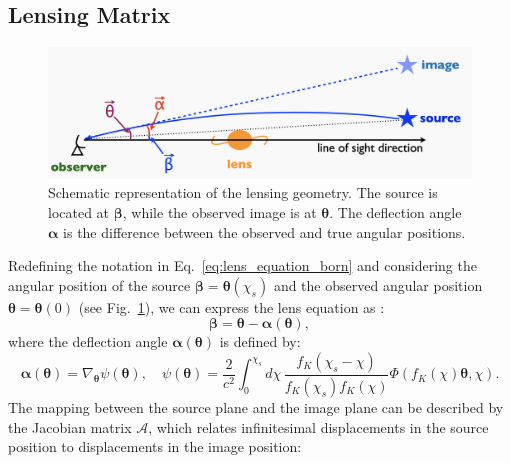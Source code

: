 \subsection{Lensing Matrix}
\begin{figure}[ht]
    \centering
    \includegraphics[width=\textwidth]{figures/Lens_overview_Oguri.png}
    \caption{Schematic representation of the lensing geometry. The source is located at $\boldsymbol{\beta}$, while the observed image is at $\boldsymbol{\theta}$. The deflection angle $\boldsymbol{\alpha}$ is the difference between the observed and true angular positions.}
    \label{fig:lens_geometry}
\end{figure}
Redefining the notation in Eq.~\eqref{eq:lens_equation_born} and considering the angular position of the source $\boldsymbol{\beta} = \boldsymbol{\theta}(\chi_s)$ and the observed angular position $\boldsymbol{\theta} = \boldsymbol{\theta}(0)$ (see Fig.~\ref{fig:lens_geometry}), we can express the lens equation as \citep{2001PhR...340..291B, 2009A&A...499...31H, 2015RPPh...78h6901K}:
\begin{equation}
    \boldsymbol{\beta} = \boldsymbol{\theta} - \boldsymbol{\alpha}(\boldsymbol{\theta}),
    \label{eq:lens_equation_vector}
\end{equation}
where the deflection angle \( \boldsymbol{\alpha}(\boldsymbol{\theta}) \) is defined by:
\begin{equation}
    \boldsymbol{\alpha}(\boldsymbol{\theta}) = \nabla_{\boldsymbol{\theta}} \psi(\boldsymbol{\theta}), \quad \psi(\boldsymbol{\theta}) = \frac{2}{c^2} \int_0^{\chi_s} d\chi \, \frac{f_K(\chi_s - \chi)}{f_K(\chi_s)f_K(\chi)} \Phi\left(f_K(\chi) \boldsymbol{\theta}, \chi\right).
    \label{eq:deflection_angle}
\end{equation}
The mapping between the source plane and the image plane can be described by the Jacobian matrix $\mathcal{A}$, which relates infinitesimal displacements in the source position to displacements in the image position:
